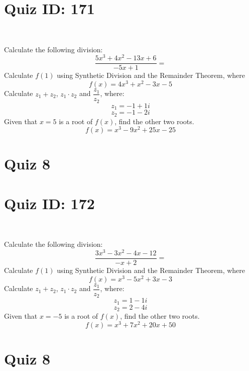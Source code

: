 \documentclass{exam}
\begin{document}
\section*{Quiz ID: 171}
\vspace{0.5cm}\
\vspace{1cm}\
\begin{questions}
\question Calculate the following division:\[\dfrac{
5x^3 + 4x^2 - 13x + 6}{
-5x + 1}=\] \makeemptybox{\stretch{2}}
\question Calculate $f(1)$ using Synthetic Division and the Remainder Theorem, where\[f(x) = 
4x^3 + x^2 - 3x - 5\]
\newpage\question Calculate $z_1+z_2$, $z_1\cdot z_2$ and $\dfrac{z_1}{z_2}$, where:\[z_1=-1+1\mathit{i}\]\[z_2=-1-2\mathit{i}\]
\question Given that $x=5$ is a root of $f(x)$, find the other two roots.\[f(x)=
x^3 - 9x^2 + 25x - 25\]\makeemptybox{\stretch{1}}
\end{questions}\newpage
\newpage
\section*{Quiz 8}
\section*{Quiz ID: 172}
\vspace{0.5cm}\
\vspace{1cm}\
\begin{questions}
\question Calculate the following division:\[\dfrac{
3x^3 - 3x^2 - 4x - 12}{
-x + 2}=\] 
\question Calculate $f(1)$ using Synthetic Division and the Remainder Theorem, where\[f(x) = 
x^3 - 5x^2 + 3x - 3\]
\newpage\question Calculate $z_1+z_2$, $z_1\cdot z_2$ and $\dfrac{z_1}{z_2}$, where:\[z_1=1-1\mathit{i}\]\[z_2=2-4\mathit{i}\]\makeemptybox{\stretch{1}}
\question Given that $x=-5$ is a root of $f(x)$, find the other two roots.\[f(x)=
x^3 + 7x^2 + 20x + 50\]\makeemptybox{\stretch{1}}
\end{questions}\newpage
\newpage
\section*{Quiz 8}
\end{document}
